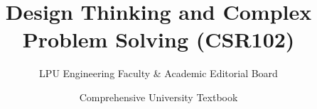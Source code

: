 \documentclass[a4paper,11pt,oneside,openany]{book}
\title{Design Thinking and Complex Problem Solving (CSR102)}
\author{LPU Engineering Faculty \& Academic Editorial Board}
\date{Comprehensive University Textbook}
\begin{document}
\frontmatter

\makebookcover
\copyrightpage
\disclaimerpage

\tableofcontents
\newpage

\mainmatter







\end{document}
